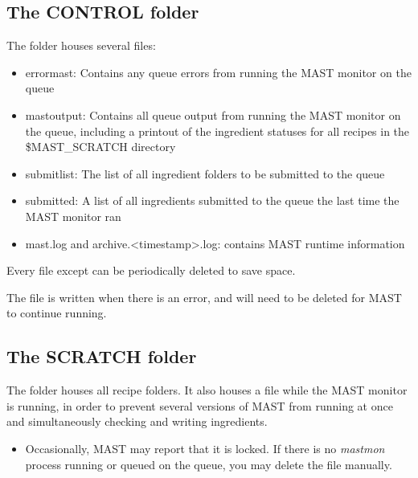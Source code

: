 \documentclass[letterpaper,10pt,english]{sphinxmanual}
\begin{document}
\subsection{The CONTROL folder}
\label{5_0_runningmast:the-control-folder}
The  folder houses several files:
\begin{itemize}
\item {} 
errormast: Contains any queue errors from running the MAST monitor on the queue

\item {} 
mastoutput: Contains all queue output from running the MAST monitor on the queue, including a printout of the ingredient statuses for all recipes in the \$MAST\_SCRATCH directory

\item {} 
submitlist: The list of all ingredient folders to be submitted to the queue

\item {} 
submitted: A list of all ingredients submitted to the queue the last time the MAST monitor ran

\item {} 
mast.log and archive.\textless{}timestamp\textgreater{}.log: contains MAST runtime information

\end{itemize}

Every file except  can be periodically deleted to save space.

The  file is written when there is an error, and will need to be deleted for MAST to continue running.


\subsection{The SCRATCH folder}
\label{5_0_runningmast:the-scratch-folder}
The  folder houses all recipe folders. It also houses a  file while the MAST monitor is running, in order to prevent several versions of MAST from running at once and simultaneously checking and writing ingredients.
\begin{itemize}
\item {} 
Occasionally, MAST may report that it is locked. If there is no \emph{mastmon} process running or queued on the queue, you may delete the  file manually.

\end{itemize}
\end{document}

